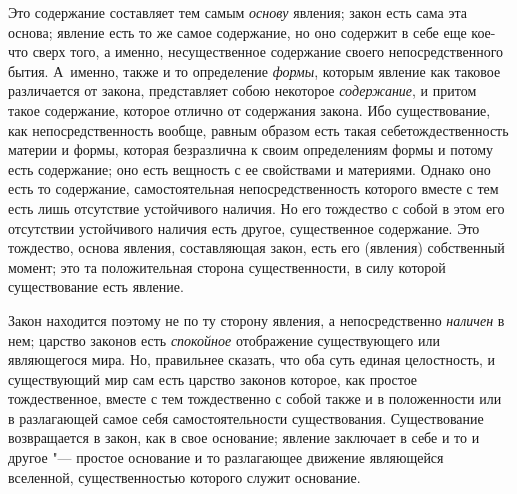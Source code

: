 Это содержание составляет тем самым {\em основу}
явления; закон есть сама эта основа; явление есть то же самое содержание,
но оно содержит в себе еще кое-что сверх того, а именно, несущественное
содержание своего непосредственного бытия. А~именно, также и то определение
{\em формы}, которым явление как таковое различается от
закона, представляет собою некоторое {\em содержание},
и притом такое содержание, которое отлично от содержания закона. Ибо
существование, как непосредственность вообще, равным образом есть такая
себетождественность материи и формы, которая безразлична к своим
определениям формы и потому есть содержание; оно есть вещность с ее
свойствами и материями. Однако оно есть то содержание, самостоятельная
непосредственность которого вместе с тем есть лишь отсутствие устойчивого
наличия. Но его тождество с собой в этом его отсутствии устойчивого наличия
есть другое, существенное содержание. Это тождество, основа явления,
составляющая закон, есть его (явления) собственный момент; это та
положительная сторона существенности, в силу которой существование есть
явление.

Закон находится поэтому не по ту сторону явления, а непосредственно
{\em наличен} в нем; царство законов есть
{\em спокойное} отображение существующего или
являющегося мира. Но, правильнее сказать, что оба суть единая целостность,
и существующий мир сам есть царство законов которое, как простое
тождественное, вместе с тем тождественно с собой также и в положенности или
в разлагающей самое себя самостоятельности существования. Существование
возвращается в закон, как в свое основание; явление заключает в себе и то и
другое "--- простое основание и то разлагающее движение являющейся вселенной,
существенностью которого служит основание.


